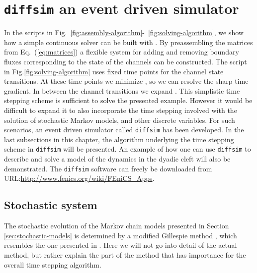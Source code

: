 \section{\texttt{diffsim} an event driven simulator}
\label{sec:diffsim}
In the scripts in Fig.~\ref{fig:assembly-algorithm}-~\ref{fig:solving-algorithm}, we show how a simple continuous solver can be built with \pydolfin. By preassembling the matrices from Eq.~(\ref{eq:matrices}) a flexible system for adding and removing boundary fluxes corresponding to the state of the channels can be constructed. The script in Fig.\ref{fig:solving-algorithm} uses fixed time points for the channel state transitions. At these time points we minimize \Dt, so we can resolve the sharp time gradient. In between the channel transitions we expand \Dt. This simplistic time stepping scheme is sufficient to solve the presented example. However it would be difficult to expand it to also incorporate the time stepping involved with the solution of stochastic Markov models, and other discrete variables. For such scenarios, an event driven simulator called \texttt{diffsim} has been developed. In the last subsections in this chapter, the algorithm underlying the time stepping scheme in \texttt{diffsim} will be presented. An example of how one can use \texttt{diffsim} to describe and solve a model of the \Ca dynamics in the dyadic cleft will also be demonstrated. The \texttt{diffsim} software can freely be downloaded from URL:\url{http://www.fenics.org/wiki/FEniCS_Apps}.\par

\subsection*{Stochastic system}
\label{sec:stochastic-system}
The stochastic evolution of the Markov chain models presented in Section \ref{sec:stochastic-models} is determined by a modified Gillespie method \cite{Gillespie1977}, which resembles the one presented in \citet{RudigerShuaiEtAl2007}. Here we will not go into detail of the actual method, but rather explain the part of the method that has importance for the overall time stepping algorithm.\par

